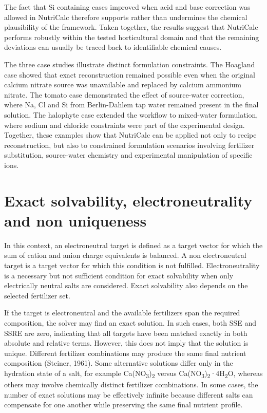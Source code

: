 \documentclass[
  letterpaper,
  DIV=11,
  numbers=noendperiod]{scrreprt}
\begin{document}
The fact that Si containing cases improved when acid and base correction
was allowed in NutriCalc therefore supports rather than undermines the
chemical plausibility of the framework. Taken together, the results
suggest that NutriCalc performs robustly within the tested horticultural
domain and that the remaining deviations can usually be traced back to
identifiable chemical causes.

The three case studies illustrate distinct formulation constraints. The
Hoagland case showed that exact reconstruction remained possible even
when the original calcium nitrate source was unavailable and replaced by
calcium ammonium nitrate. The tomato case demonstrated the effect of
source-water correction, where Na, Cl and Si from Berlin-Dahlem tap
water remained present in the final solution. The halophyte case
extended the workflow to mixed-water formulation, where sodium and
chloride constraints were part of the experimental design. Together,
these examples show that NutriCalc can be applied not only to recipe
reconstruction, but also to constrained formulation scenarios involving
fertilizer substitution, source-water chemistry and experimental
manipulation of specific ions.

\section{Exact solvability, electroneutrality and non
uniqueness}\label{exact-solvability-electroneutrality-and-non-uniqueness}

In this context, an electroneutral target is defined as a target vector
for which the sum of cation and anion charge equivalents is balanced. A
non electroneutral target is a target vector for which this condition is
not fulfilled. Electroneutrality is a necessary but not sufficient
condition for exact solvability when only electrically neutral salts are
considered. Exact solvability also depends on the selected fertilizer
set.

If the target is electroneutral and the available fertilizers span the
required composition, the solver may find an exact solution. In such
cases, both SSE and SSRE are zero, indicating that all targets have been
matched exactly in both absolute and relative terms. However, this does
not imply that the solution is unique. Different fertilizer combinations
may produce the same final nutrient composition (Steiner, 1961). Some
alternative solutions differ only in the hydration state of a salt, for
example Ca(NO\textsubscript{3})\textsubscript{2} versus
Ca(NO\textsubscript{3})\textsubscript{2}·4H\textsubscript{2}O, whereas
others may involve chemically distinct fertilizer combinations. In some
cases, the number of exact solutions may be effectively infinite because
different salts can compensate for one another while preserving the same
final nutrient profile.
\end{document}

